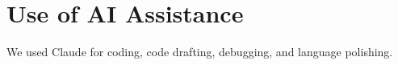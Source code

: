 \begin{table}[h!]
\centering
\caption{Zero-shot vs.\ SFT \textit{exception\_only} across four models ($N{=}1{,}190$). Zero-shot accuracy is uncorrelated with model size; SFT normalizes cross-architecture variance from 42.44pp to 0.50pp.}
\label{tab:zeroshot_cross_model}
\small
{}
\end{table}

\section{Use of AI Assistance}
We used Claude for coding, code drafting, debugging, and language polishing.
